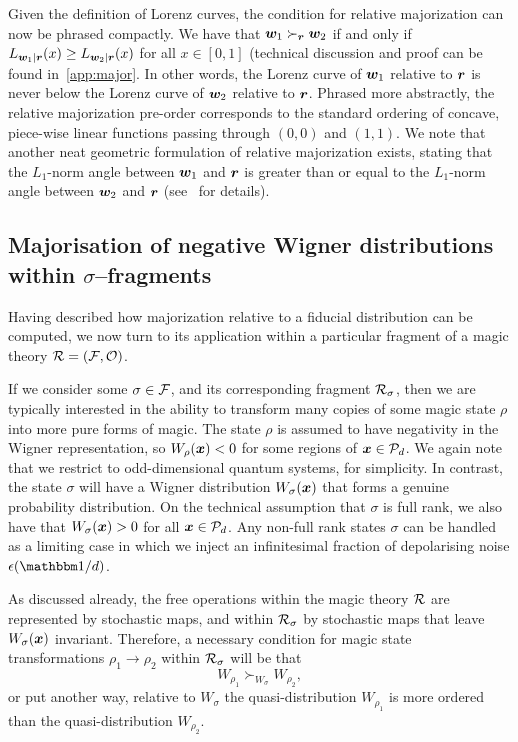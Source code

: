 \documentclass[pra,
aps,
twocolumn,
superscriptaddress,
groupedaddress,
nofootinbib,
reprint
]{revtex4-1}
\begin{document}
Given the definition of Lorenz curves, the condition for relative majorization can now be phrased compactly. We have that $\boldsymbol{w}_1 \succ_{\boldsymbol{r}} \boldsymbol{w}_2$ if and only if $L_{\boldsymbol{w}_1 | \boldsymbol{r}} (x) \ge L_{\boldsymbol{w}_2 | \boldsymbol{r}}(x)$ for all $x \in [0,1]$ (technical discussion and proof can be found in~\cref{app:major}. In other words, the Lorenz curve of $\boldsymbol{w}_1$ relative to $\boldsymbol{r}$ is never below the Lorenz curve of $\boldsymbol{w}_2$ relative to $\boldsymbol{r}$. Phrased more abstractly, the relative majorization pre-order corresponds to the standard ordering of concave, piece-wise linear functions passing through $(0,0)$ and $(1,1)$. We note that another neat geometric formulation of relative majorization exists, stating that the $L_1$-norm angle between $\boldsymbol{w}_1$ and $\boldsymbol{r}$ is greater than or equal to the $L_1$-norm angle between $\boldsymbol{w}_2$ and $\boldsymbol{r}$ (see~\cite{Busch_1998} for details).

\subsection{Majorisation of negative Wigner distributions within $\sigma$--fragments}
\label{sec:major_frag}

Having described how majorization relative to a fiducial distribution can be computed, we now turn to its application within a particular fragment of a magic theory $\mathcal{R}= (\mathcal{F}, \mathcal{O})$.

If we consider some $\sigma \in \mathcal{F}$, and its corresponding fragment $\mathcal{R}_\sigma$, then we are typically interested in the ability to transform many copies of some magic state $\rho$ into more pure forms of magic. The state $\rho$ is assumed to have negativity in the Wigner representation, so $W_\rho(\boldsymbol{x}) < 0$ for some regions of $\boldsymbol{x} \in {\mathcal P}_d$. We again note that we restrict to odd-dimensional quantum systems, for simplicity. In contrast, the state $\sigma$ will have a Wigner distribution $W_\sigma(\boldsymbol{x})$ that forms a genuine probability distribution. On the technical assumption that $\sigma$ is full rank, we also have that $W_\sigma(\boldsymbol{x}) > 0$ for all $\boldsymbol{x} \in {\mathcal P}_d$. Any non-full rank states $\sigma$ can be handled as a limiting case in which we inject an infinitesimal fraction of depolarising noise $\epsilon (\id/d)$.

As discussed already, the free operations within the magic theory $\mathcal{R}$ are represented by stochastic maps, and within $\mathcal{R}_\sigma$ by stochastic maps that leave $W_\sigma(\boldsymbol{x})$ invariant. Therefore, a necessary condition for magic state transformations $\rho_1 \rightarrow \rho_2$ within $\mathcal{R}_\sigma$ will be that 
\begin{equation}
W_{\rho_1} \succ_{W_{\sigma}} W_{\rho_2},
\end{equation}
or put another way, relative to $W_\sigma$ the quasi-distribution $W_{\rho_1}$ is more ordered than the quasi-distribution $W_{\rho_2}$. 
\end{document}
